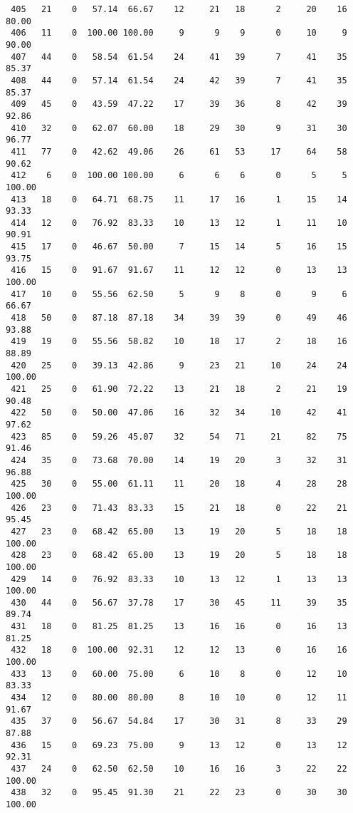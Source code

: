 \begin{verbatim}
 405   21    0   57.14  66.67    12     21   18      2     20    16    80.00
 406   11    0  100.00 100.00     9      9    9      0     10     9    90.00
 407   44    0   58.54  61.54    24     41   39      7     41    35    85.37
 408   44    0   57.14  61.54    24     42   39      7     41    35    85.37
 409   45    0   43.59  47.22    17     39   36      8     42    39    92.86
 410   32    0   62.07  60.00    18     29   30      9     31    30    96.77
 411   77    0   42.62  49.06    26     61   53     17     64    58    90.62
 412    6    0  100.00 100.00     6      6    6      0      5     5   100.00
 413   18    0   64.71  68.75    11     17   16      1     15    14    93.33
 414   12    0   76.92  83.33    10     13   12      1     11    10    90.91
 415   17    0   46.67  50.00     7     15   14      5     16    15    93.75
 416   15    0   91.67  91.67    11     12   12      0     13    13   100.00
 417   10    0   55.56  62.50     5      9    8      0      9     6    66.67
 418   50    0   87.18  87.18    34     39   39      0     49    46    93.88
 419   19    0   55.56  58.82    10     18   17      2     18    16    88.89
 420   25    0   39.13  42.86     9     23   21     10     24    24   100.00
 421   25    0   61.90  72.22    13     21   18      2     21    19    90.48
 422   50    0   50.00  47.06    16     32   34     10     42    41    97.62
 423   85    0   59.26  45.07    32     54   71     21     82    75    91.46
 424   35    0   73.68  70.00    14     19   20      3     32    31    96.88
 425   30    0   55.00  61.11    11     20   18      4     28    28   100.00
 426   23    0   71.43  83.33    15     21   18      0     22    21    95.45
 427   23    0   68.42  65.00    13     19   20      5     18    18   100.00
 428   23    0   68.42  65.00    13     19   20      5     18    18   100.00
 429   14    0   76.92  83.33    10     13   12      1     13    13   100.00
 430   44    0   56.67  37.78    17     30   45     11     39    35    89.74
 431   18    0   81.25  81.25    13     16   16      0     16    13    81.25
 432   18    0  100.00  92.31    12     12   13      0     16    16   100.00
 433   13    0   60.00  75.00     6     10    8      0     12    10    83.33
 434   12    0   80.00  80.00     8     10   10      0     12    11    91.67
 435   37    0   56.67  54.84    17     30   31      8     33    29    87.88
 436   15    0   69.23  75.00     9     13   12      0     13    12    92.31
 437   24    0   62.50  62.50    10     16   16      3     22    22   100.00
 438   32    0   95.45  91.30    21     22   23      0     30    30   100.00

\end{verbatim}
